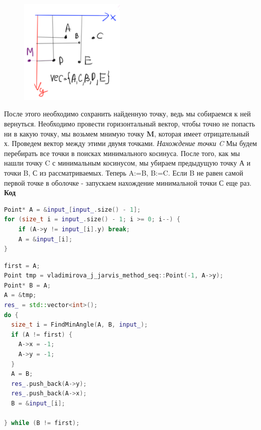 \documentclass[a4paper]{article}
\begin{document}
\begin{figure}[h] %
    \centering %
    \includegraphics[width=0.45\textwidth]{image3.png} %
    \caption{} %
    \label{fig:example} %
\end{figure}
 После этого необходимо сохранить найденную точку, ведь мы собираемся к ней вернуться.
 Необходимо провести горизонтальный вектор, чтобы точно не попасть ни в какую точку, мы возьмем мнимую точку \textbf{M}, которая имеет отрицательный х. Проведем вектор между этими двумя точками.
 \textit{Нахождение точки C}
 Мы будем перебирать все точки в поисках минимального косинуса. После того, как мы нашли точку C с минимальным косинусом, мы убираем предыдущую точку А и точки B, С из рассматриваемых. Теперь A:=B, B:=C. Если B не равен самой первой точке в оболочке - запускаем нахождение минимальной точки С еще раз.\\
 
\textbf{Код}
\begin{lstlisting}[language=C++, caption=Первая часть алгоритма:, label=lst:example]
Point* A = &input_[input_.size() - 1];
for (size_t i = input_.size() - 1; i >= 0; i--) { 
    if (A->y != input_[i].y) break;
    A = &input_[i];
}
\end{lstlisting}

\begin{lstlisting}[language=C++, caption=Вторая часть алгоритма:, label=lst:example]
first = A;
Point tmp = vladimirova_j_jarvis_method_seq::Point(-1, A->y);
Point* B = A;
A = &tmp;
res_ = std::vector<int>();
do {
  size_t i = FindMinAngle(A, B, input_);
  if (A != first) {
    A->x = -1;
    A->y = -1;
  }
  A = B;
  res_.push_back(A->y);
  res_.push_back(A->x);
  B = &input_[i];

} while (B != first);
\end{lstlisting}
\end{document}
